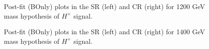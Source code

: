\begin{figure}[H]
  \centering
  \caption{Post-fit (BOnly) plots in the SR (left) and CR (right) for 1200 GeV mass hypothesis of $H^{+}$ signal.}
  \label{fig:Postfit_Hp1200_Blind}
\end{figure}
\begin{figure}[H]
  \centering
  \caption{Post-fit (BOnly) plots in the SR (left) and CR (right) for 1400 GeV mass hypothesis of $H^{+}$ signal.}
  \label{fig:Postfit_Hp1400_Blind}
\end{figure}

